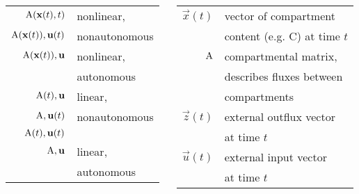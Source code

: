 \begin{columns}
	\setlength{\lc}{0.5\textwidth}
	\begin{column}{\lc}
	\begin{center}
		\begin{tabular}{rl}
		 $\mathbf{\mathrm{A}}(\mathbf{x}(t), t)$ & nonlinear, \\
		 $\mathbf{\mathrm{A}}(\mathbf{x}(t)), \mathbf{u}(t)$ & nonautonomous\\
		 \hline
		 $\mathbf{\mathrm{A}}(\mathbf{x}(t)), \mathbf{u}$ & nonlinear,\\
		& autonomous \\
		 \hline
		 $\mathbf{\mathrm{A}}(t), \mathbf{u}$ & linear, \\
		 $\mathbf{\mathrm{A}}, \mathbf{u}(t)$ & nonautonomous\\
		 $\mathbf{\mathrm{A}}(t), \mathbf{u}(t)$\\
		 \hline
		 $\mathbf{\mathrm{A}}, \mathbf{u}$ & linear,\\
		&  autonomous
		\end{tabular}
	\end{center}
	\end{column}
	\setlength{\rc}{\the\dimexpr (\textwidth-\lc) \relax }
	\begin{column}{\rc}
		\begin{center}
		\begin{tabular}{rl}
		  $\vec{x}(t)$ & vector of compartment \\
		& content (e.g. C) at time $t$\\
		  $\mathbf{\mathrm{A}}$ & compartmental matrix,\\
		 & describes fluxes between\\
		 & compartments\\
		  $\vec{z}(t)$ & external outflux vector\\
		 &  at time $t$\\
		  $\vec{u}(t)$ & external input vector\\
		 & at time $t$\\
		\end{tabular}
	\end{center}
	\end{column}
\end{columns}

